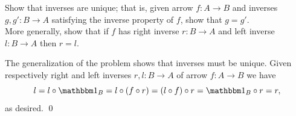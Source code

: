 \begin{bookproblem}
  Show that inverses are unique; that is, given arrow \(f : A \to B\) and
  inverses \(g, g' : B \to A\) satisfying the inverse property of \(f\), show
  that \(g = g'\).\\

  More generally, show that if \(f\) has right inverse \(r:B \to A\) and left
  inverse \(l:B \to A\) then \(r = l\).
  \begin{Solution}
    The generalization of the problem shows that inverses must be unique. Given
    respectively right and left inverses \(r, l : B \to A\) of arrow \(f: A \to
    B\) we have 
    \[l = l \circ \id_B = l \circ (f \circ r) = (l \circ f) \circ
    r = \id_B \circ r = r,\]
    as desired. \qed{}
  \end{Solution}
\end{bookproblem}

